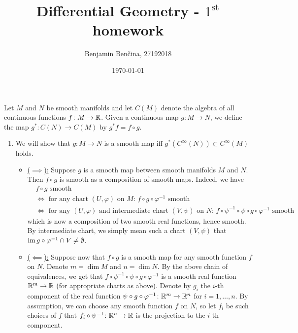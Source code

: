 \documentclass[a4paper, 12pt]{article}
\title{Differential Geometry - $1^{\text{st}}$ homework}
\author{Benjamin Benčina, 27192018}
\date{\today}
\begin{document}
\maketitle

\begin{Exercise}
    Let $M$ and $N$ be smooth manifolds and let $C(M)$ denote the algebra of all continuous functions $f \colon M \to \mathbb{R}$.
    Given a continuous map $g \colon M \to N$, we define the map $g^* \colon C(N) \to C(M)$ by $g^*f = f \circ g$.
    \begin{enumerate}[label=(\roman*)]
        \item
            We will show that $g \colon M \to N$ is a smooth map iff $g^*(C^\infty(N)) \subset C^\infty(M)$ holds.

            \begin{itemize}
                \item \underline{($\implies$):}
                    Suppose $g$ is a smooth map between smooth manifolds $M$ and $N$.
                    Then $f \circ g$ is smooth as a composition of smooth maps.
                    Indeed, we have
                    \begin{align*}
                        &f \circ g \text{ smooth } \\
                        &\iff \text{ for any chart $(U, \varphi)$ on $M$: $f \circ g \circ \varphi^{-1}$ smooth} \\
                        &\iff \text{ for any $(U, \varphi)$ and intermediate chart $(V, \psi)$ on $N$: $f \circ \psi^{-1} \circ \psi \circ g \circ \varphi^{-1}$ smooth}
                    \end{align*}
                    which is now a composition of two smooth real functions, hence smooth.
                    By intermediate chart, we simply mean such a chart $(V, \psi)$ that $\operatorname{im} g \circ \varphi^{-1} \cap V \neq \emptyset$.
                \item \underline{($\impliedby$):}
                    Suppose now that $f \circ g$ is a smooth map for any smooth function $f$ on $N$.
                    Denote $m = \dim M$ and $n = \dim N$.
                    By the above chain of equivalences, we get that $f \circ \psi^{-1} \circ \psi \circ g \circ \varphi^{-1}$ is a smooth real function $\mathbb{R}^m \to \mathbb{R}$ (for appropriate charts as above).
                    Denote by $g_i$ the $i$-th component of the real function $\psi \circ g \circ \varphi^{-1} \colon \mathbb{R}^m \to \mathbb{R}^n$ for $i = 1,\dots,n$.
                    By assumption, we can choose any smooth function $f$ on $N$, so let $f_i$ be such choices of $f$ that $f_i \circ \psi^{-1} \colon \mathbb{R}^n \to \mathbb{R}$ is the projection to the $i$-th component.

\end{itemize}
\end{enumerate}
\end{Exercise}
\end{document}
